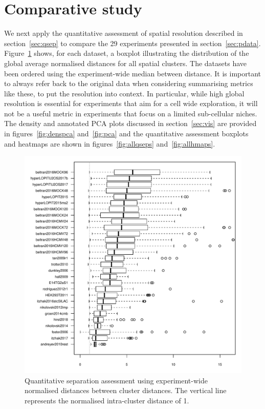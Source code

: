 \documentclass[12pt]{article}\usepackage[]{graphicx}\usepackage[]{color}
\newenvironment{knitrout}{}{} %
\begin{document}
\clearpage

\section{Comparative study}\label{sec:compara}

We next apply the quantitative assessment of spatial resolution
described in section~\ref{sec:qsep} to compare the 29
experiments presented in
section~\ref{sec:pdata}. Figure~\ref{fig:qsep} shows, for each
dataset, a boxplot illustrating the distribution of the global average
normalised distances for all spatial clusters. The datasets have been
ordered using the experiment-wide median between distance. It is
important to always refer back to the original data when considering
summarising metrics like these, to put the resolution into context. In
particular, while high global resolution is essential for experiments
that aim for a cell wide exploration, it will not be a useful metric
in experiments that focus on a limited sub-cellular niches. The
density and annotated PCA plots discussed in section~\ref{sec:vis} are
provided in figures~\ref{fig:denspca} and~\ref{fig:pca} and the
quantitative assessment boxplots and heatmaps are shown in
figures~\ref{fig:allqseps} and~\ref{fig:allhmaps}.



\begin{figure}[ht]
  \centering
\begin{knitrout}
\color{fgcolor}
\includegraphics[width=0.65\linewidth]{figure/figqsep-1} 

\end{knitrout}
\caption{Quantitative separation assessment using experiment-wide
  normalised distances between cluster distances. The vertical line
  represents the normalised intra-cluster distance of 1.}
  \label{fig:qsep}
\end{figure}
\end{document}
